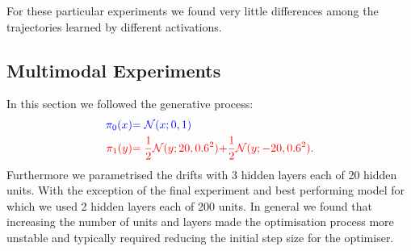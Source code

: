 \documentclass[a4paper,12pt,twoside,openright]{report}
\theoremstyle{definition}
\begin{document}
For these particular experiments we found very little differences among the trajectories learned by different activations.
\subsection{Multimodal Experiments}
In this section we followed the generative process:
\begin{align*}
     \color{blue}{\pi_0(x)} &\color{blue}{= {\mathcal{N}}(x; 0,  1)} \\
    \color{red}{\pi_1(y)} &\color{red}{= \frac{1}{2}{\mathcal{N}}(y; 20, 0.6 ^2)}\color{red}{ + \frac{1}{2}{\mathcal{N}}(y; -20, 0.6 ^2) }.
\end{align*}
Furthermore we parametrised the drifts with 3 hidden layers each of 20 hidden units. With the exception of the final experiment and best performing model for which we used 2 hidden layers each of 200 units. In general we found that increasing the number of units and layers made the optimisation process more unstable and typically required reducing the initial step size for the optimiser.
\end{document}

